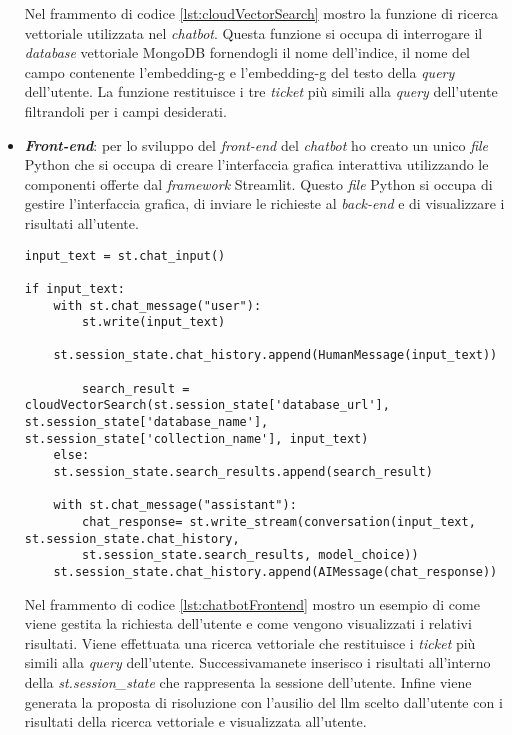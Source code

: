 \begin{itemize}
    Nel frammento di codice \ref{lst:cloudVectorSearch} mostro la funzione di ricerca vettoriale utilizzata nel \textit{chatbot}. Questa funzione si occupa di interrogare il \textit{database} vettoriale MongoDB fornendogli il nome dell'indice, il nome del campo contenente l'\gls{embedding-g} e l'\gls{embedding-g} del testo della \textit{query} dell'utente. La funzione restituisce i tre \textit{ticket} più simili alla \textit{query} dell'utente filtrandoli per i campi desiderati.
    \item \textbf{\textit{Front-end}}: per lo sviluppo del \textit{front-end} del \textit{chatbot} ho creato un unico \textit{file} Python che si occupa di creare l'interfaccia grafica interattiva utilizzando le componenti offerte dal \textit{framework} Streamlit. Questo \textit{file} Python si occupa di gestire l'interfaccia grafica, di inviare le richieste al \textit{back-end} e di visualizzare i risultati all'utente.
    \begin{verbatim}
input_text = st.chat_input()

if input_text:
    with st.chat_message("user"):
        st.write(input_text)

    st.session_state.chat_history.append(HumanMessage(input_text))

        search_result = cloudVectorSearch(st.session_state['database_url'], st.session_state['database_name'], st.session_state['collection_name'], input_text)
    else:
    st.session_state.search_results.append(search_result)

    with st.chat_message("assistant"):
        chat_response= st.write_stream(conversation(input_text, st.session_state.chat_history,
        st.session_state.search_results, model_choice))
    st.session_state.chat_history.append(AIMessage(chat_response))
    \end{verbatim}
    \vspace{-0.3cm}
    \label{lst:chatbotFrontend} 
    \vspace{0.3cm}

    Nel frammento di codice \ref{lst:chatbotFrontend} mostro un esempio di come viene gestita la richiesta dell'utente e come vengono visualizzati i relativi risultati. Viene effettuata una ricerca vettoriale che restituisce i \textit{ticket} più simili alla \textit{query} dell'utente. 
    Successivamanete inserisco i risultati all'interno della \textit{st.session\_state} che rappresenta la sessione dell'utente. Infine viene generata la proposta di risoluzione con l'ausilio del \gls{llm} scelto dall'utente con i risultati della ricerca vettoriale e visualizzata all'utente.
\end{itemize}

